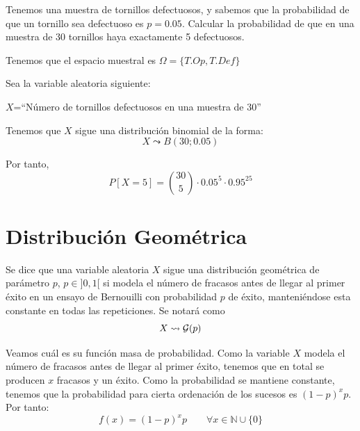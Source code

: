 \begin{ejemplo}
    Tenemos una muestra de tornillos defectuosos, y sabemos que la probabilidad de que un tornillo sea defectuoso es $p=0.05$. Calcular la probabilidad de que en una muestra de 30 tornillos haya exactamente 5 defectuosos.

    Tenemos que el espacio muestral es $\Omega = \{T.Op, T.Def\}$
    
    Sea la variable aleatoria siguiente:
    \begin{center}
        $X$=``Número de tornillos defectuosos en una muestra de 30''
    \end{center}
    
    Tenemos que $X$ sigue una distribución binomial de la forma:
    \begin{equation*}
        X\leadsto B(30;0.05)
    \end{equation*}
    
    Por tanto,
    \begin{equation*}
        P[X=5] = \binom{30}{5}\cdot 0.05^5 \cdot 0.95^{25}
    \end{equation*}
\end{ejemplo}

\section{Distribución Geométrica}

\begin{definicion}
    Se dice que una variable aleatoria $X$ sigue una distribución geométrica de parámetro $p$, $p\in ]0,1[$ si modela el número de fracasos antes de llegar al primer éxito en un ensayo de Bernouilli con probabilidad $p$ de éxito, manteniéndose esta constante en todas las repeticiones. Se notará como $$X\leadsto \mathcal{G}(p)$$
\end{definicion}

Veamos cuál es su función masa de probabilidad. Como la variable $X$ modela el número de fracasos antes de llegar al primer éxito, tenemos que en total se producen $x$ fracasos y un éxito. Como la probabilidad se mantiene constante, tenemos que la probabilidad para cierta ordenación de los sucesos es $(1-p)^{x}p$. Por tanto:
\begin{equation*}
    f(x) = (1-p)^{x}p \qquad \forall x\in \mathbb{N}\cup \{0\}
\end{equation*}

